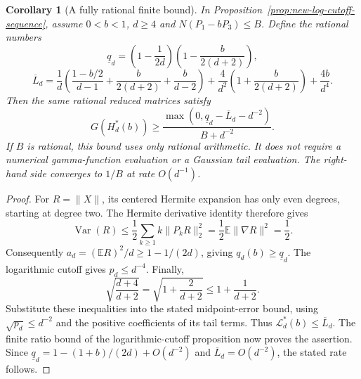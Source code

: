 \documentclass[11pt]{article}
\newtheorem{corollary}[theorem]{Corollary}
\begin{document}
\begin{corollary}[A fully rational finite bound]
\label{cor:new-rational-log-cutoff-bound}
In Proposition~\ref{prop:new-log-cutoff-sequence}, assume
$0<b<1$, $d\geq4$ and $N(P_1-bP_3)\leq B$. Define the rational numbers
\[
 \underline q_d=
 \left(1-\frac1{2d}\right)
 \left(1-\frac b{2(d+2)}\right),
\]
\[
 \overline L_d=
 \frac1d\left(\frac{1-b/2}{d-1}
                   +\frac b{2(d+2)}+\frac b{d-2}\right)
 +\frac4{d^2}\left(1+\frac b{2(d+2)}\right)
 +\frac{4b}{d^4}.
\]
Then the same rational reduced matrices satisfy
\[
 G(H_d^*(b))\geq
 \frac{\max(0,\underline q_d-\overline L_d-d^{-2})}{B+d^{-2}}.
\]
If $B$ is rational, this bound uses only rational arithmetic. It does
not require a numerical gamma-function evaluation or a Gaussian tail
evaluation. The right-hand side converges to $1/B$ at rate $O(d^{-1})$.
\end{corollary}
\begin{proof}
For $R=\|X\|$, its centered Hermite expansion has only even degrees,
starting at degree two. The Hermite derivative identity therefore gives
\[
 \operatorname{Var}(R)\leq
 \frac12\sum_{k\geq1}k\|P_kR\|_2^2
 =\frac12\mathbb E\|\nabla R\|^2=\frac12.
\]
Consequently $a_d=(\mathbb ER)^2/d\geq1-1/(2d)$, giving
$q_d(b)\geq\underline q_d$. The logarithmic cutoff gives
$p_d\leq d^{-4}$. Finally,
\[
 \sqrt{\frac{d+4}{d+2}}
 =\sqrt{1+\frac2{d+2}}\leq1+\frac1{d+2}.
\]
Substitute these inequalities into the stated midpoint-error bound,
using $\sqrt{p_d}\leq d^{-2}$ and the positive coefficients of its
tail terms. Thus $\mathcal L_d^*(b)\leq\overline L_d$.
The finite ratio bound of the logarithmic-cutoff proposition now proves
the assertion. Since $\underline q_d=1-(1+b)/(2d)+O(d^{-2})$ and
$\overline L_d=O(d^{-2})$, the stated rate follows.
\end{proof}

\end{document}
